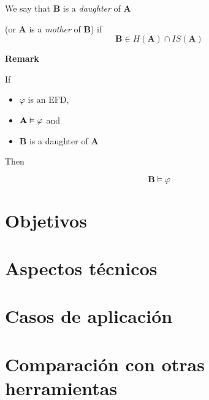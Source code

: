 \documentclass[12pt]{beamer}
\newenvironment{stepitemize}{\begin{itemize}[<+->]}{\end{itemize} }
\begin{document}
\begin{frame}
 \begin{definition}
  We say that $\mathbf{B}$ is a \textit{daughter} of $\mathbf{A}$ 

(or $\mathbf{A}$ is a \textit{mother} of $\mathbf{B}$) if 
\[ \mathbf{B} \in H(\mathbf{A}) \cap IS(\mathbf{A}) \]

 \end{definition}

\textbf{Remark} 

If 

\begin{stepitemize}
 \item $\varphi$ is an EFD,
 \item $\mathbf{A} \vDash \varphi$ and 
 \item $\mathbf{B}$ is a daughter of $\mathbf{A}$
\end{stepitemize}

\pause

Then

\[ \mathbf{B} \vDash \varphi \]


\end{frame}


\section{Objetivos}
\begin{frame} 
\end{frame}


\section{Aspectos técnicos}

\begin{frame}
\end{frame}


\section{Casos de aplicación}

\begin{frame}
\end{frame}

\section{Comparación con otras herramientas}
\begin{frame}
\end{frame}
\end{document}
